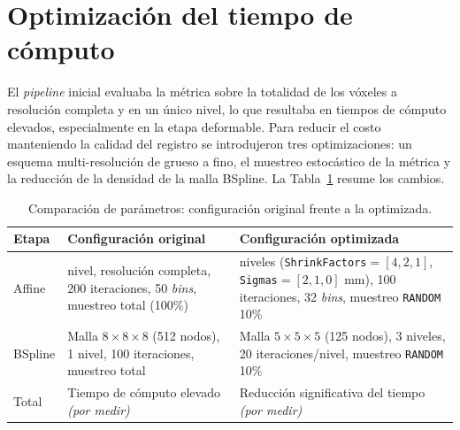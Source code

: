 \documentclass[12pt, letterpaper]{article}
\begin{document}
\section{Optimización del tiempo de cómputo}
El \textit{pipeline} inicial evaluaba la métrica sobre la totalidad de los
vóxeles a resolución completa y en un único nivel, lo que resultaba en tiempos de
cómputo elevados, especialmente en la etapa deformable. Para reducir el costo
manteniendo la calidad del registro se introdujeron tres optimizaciones: un
esquema multi-resolución de grueso a fino, el muestreo estocástico de la métrica
y la reducción de la densidad de la malla BSpline. La Tabla~\ref{tab:opt} resume
los cambios.

\begin{table}[H]
\centering
\caption{Comparación de parámetros: configuración original frente a la optimizada.}
\label{tab:opt}
\renewcommand{\arraystretch}{1.3}
\begin{tabular}{>{\raggedright\arraybackslash}p{1.8cm} >{\raggedright\arraybackslash}p{5.6cm} >{\raggedright\arraybackslash}p{5.6cm}}
\toprule
\textbf{Etapa} & \textbf{Configuración original} & \textbf{Configuración optimizada} \\
\midrule
Affine &
1 nivel, resolución completa, 200 iteraciones, 50 \textit{bins}, muestreo total (100\%) &
3 niveles (\texttt{ShrinkFactors}$=[4,2,1]$, \texttt{Sigmas}$=[2,1,0]$ mm), 100 iteraciones, 32 \textit{bins}, muestreo \texttt{RANDOM} 10\% \\
\addlinespace
BSpline &
Malla $8\times8\times8$ (512 nodos), 1 nivel, 100 iteraciones, muestreo total &
Malla $5\times5\times5$ (125 nodos), 3 niveles, 20 iteraciones/nivel, muestreo \texttt{RANDOM} 10\% \\
\addlinespace
Total &
Tiempo de cómputo elevado \textit{(por medir)} &
Reducción significativa del tiempo \textit{(por medir)} \\
\bottomrule
\end{tabular}
\end{table}
\end{document}
